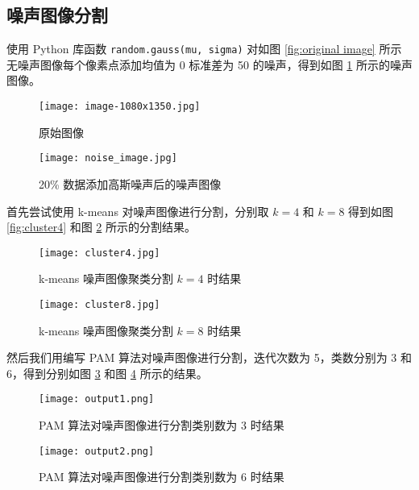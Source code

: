 \documentclass[12pt,AutoFakeBold]{article}
\begin{document}
\subsection{噪声图像分割}

使用 Python 库函数 \lstinline[language=Python]|random.gauss(mu, sigma)| 对如图 \ref{fig:original image} 所示无噪声图像每个像素点添加均值为 0 标准差为 50 的噪声，得到如图 \ref{fig:noise image} 所示的噪声图像。

\begin{figure}[htbp]
	\centering
	\begin{minipage}[t]{0.48\textwidth}
		\centering
		\texttt{[image: image-1080x1350.jpg]}
		\caption{原始图像} \label{fig:original image}
	\end{minipage}
	\begin{minipage}[t]{0.48\textwidth}
		\centering
		\texttt{[image: noise\_image.jpg]}
		\caption{20\% 数据添加高斯噪声后的噪声图像} \label{fig:noise image}
	\end{minipage}
\end{figure}


首先尝试使用 k-means 对噪声图像进行分割，分别取 $k=4$ 和 $k=8$ 得到如图 \ref{fig:cluster4} 和图 \ref{fig:cluster8} 所示的分割结果。

\begin{figure}[htbp]
	\centering
	\begin{minipage}[t]{0.48\textwidth}
		\centering
		\texttt{[image: cluster4.jpg]}
		\caption{k-means 噪声图像聚类分割 $k=4$ 时结果} \label{fig:cluster4}
	\end{minipage}
	\begin{minipage}[t]{0.48\textwidth}
		\centering
		\texttt{[image: cluster8.jpg]}
		\caption{k-means 噪声图像聚类分割 $k=8$ 时结果} \label{fig:cluster8}
	\end{minipage}
\end{figure}

然后我们用编写 PAM 算法对噪声图像进行分割，迭代次数为 5，类数分别为 3 和 6，得到分别如图 \ref{fig:output1} 和图 \ref{fig:output2} 所示的结果。

\begin{figure}[htbp]
	\centering
    \texttt{[image: output1.png]}
    \caption{PAM 算法对噪声图像进行分割类别数为 3 时结果} \label{fig:output1}
\end{figure}

\begin{figure}[htbp]
	\centering
    \texttt{[image: output2.png]}
    \caption{PAM 算法对噪声图像进行分割类别数为 6 时结果} \label{fig:output2}
\end{figure}
\end{document}
